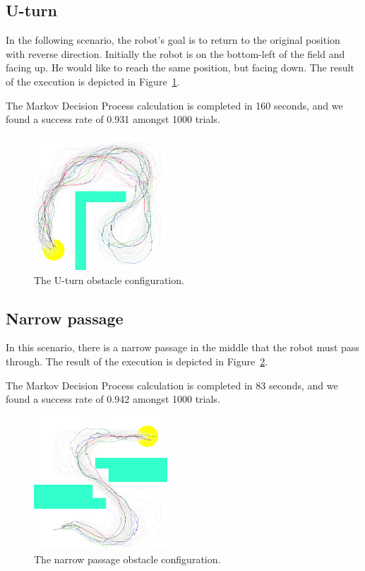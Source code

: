 \documentclass[a4paper]{article}
\begin{document}
\subsection{U-turn}

In the following scenario, the robot's goal is to return to the original position
with reverse direction. Initially the robot is on the bottom-left of the field
and facing up. He would like to reach the same position, but facing down.
The result of the execution is depicted in Figure~\ref{f:uturn}.

The Markov Decision Process calculation is completed in 160 seconds,
and we found a success rate of 0.931 amongst 1000 trials.

\begin{figure}
\caption{The U-turn obstacle configuration.}
\label{f:uturn}
\centerline{\includegraphics[width=5cm]{uturn.png}}
\end{figure}

\subsection{Narrow passage}

In this scenario, there is a narrow passage in the middle that the robot
must pass through.
The result of the execution is depicted in Figure~\ref{f:narrow}.

The Markov Decision Process calculation is completed in 83 seconds,
and we found a success rate of 0.942 amongst 1000 trials.

\begin{figure}
\caption{The narrow passage obstacle configuration.}
\label{f:narrow}
\centerline{\includegraphics[width=5cm]{narrow.png}}
\end{figure}
\end{document}
